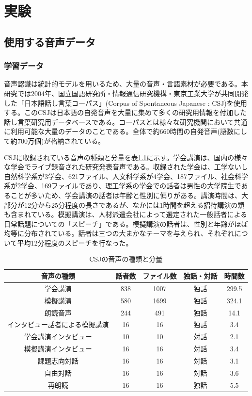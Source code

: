 \chapter{実験}
\section{使用する音声データ}
\subsection{学習データ}
音声認識は統計的モデルを用いるため、大量の音声・言語素材が必要である。本研究では2004年、国立国語研究所・情報通信研究機構・東京工業大学が共同開発した「日本語話し言葉コーパス」(Corpus of Spontaneous Japanese : CSJ)を使用する。このCSJは日本語の自発音声を大量に集めて多くの研究用情報を付加した話し言葉研究用データベースである。コーパスとは様々な研究機関において共通に利用可能な大量のデータのことである。全体で約660時間の自発音声(語数にして約700万個)が格納されている。\par
CSJに収録されている音声の種類と分量を表\ref{table:detail_csj}に示す。学会講演は、国内の様々な学会でライブ録音された研究発表音声である。収録された学会は、工学ないし自然科学系が3学会、621ファイル、人文科学系が4学会、187ファイル、社会科学系が2学会、169ファイルであり、理工学系の学会での話者は男性の大学院生であることが多いため、学会講演の話者は年齢と性別に偏りがある。講演時間は、大部分が12分から25分程度の長さであるが、なかには1時間を超える招待講演の類も含まれている。模擬講演は、人材派遣会社によって選定された一般話者による日常話題についての「スピーチ」である。模擬講演の話者は、性別と年齢がほぼ均等に分布されている。話者は三つの大まかなテーマを与えられ、それぞれについて平均12分程度のスピーチを行なった。\par

\begin{table}[htb]
  \begin{center}
    \caption{CSJの音声の種類と分量 \label{table:detail_csj}}
    \begin{tabular}{|c||c|c|c|c|} \hline
      音声の種類 & 話者数 & ファイル数 & 独話・対話 & 時間数\\ \hline
      学会講演 & 838 & 1007 & 独話 & 299.5 \\ \hline
      模擬講演 & 580 & 1699 & 独話 & 324.1 \\ \hline
      朗読音声 & 244 & 491 & 独話 & 14.1 \\ \hline
      インタビュー話者による模擬講演 & 16 & 16 & 独話 & 3.4 \\ \hline
      学会講演インタビュー & 10 & 10 & 対話 & 2.1 \\ \hline
      模擬講演インタビュー & 16 & 16 & 対話 & 3.4 \\ \hline
      課題志向対話 & 16 & 16 & 対話 & 3.1 \\ \hline
      自由対話 & 16 & 16 & 対話 & 3.6 \\ \hline
      再朗読 & 16 & 16 & 独話 & 5.5\\ \hline
    \end{tabular}
  \end{center}
\end{table}


